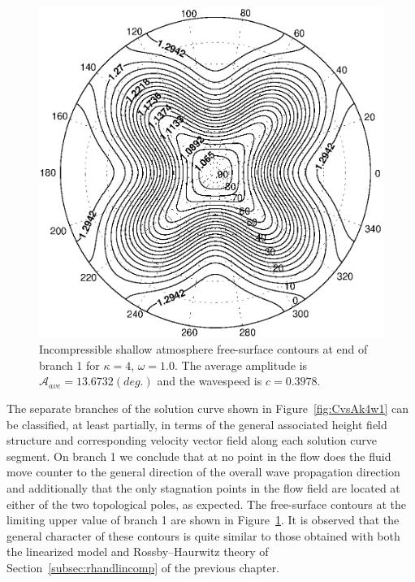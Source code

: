 \begin{figure}[htbp]
	\centering
		\includegraphics[scale=0.75]{IMAGES/k4w1fsb1end.eps}
	\caption{Incompressible shallow atmosphere free-surface contours at end of branch 1 for $\kappa=4$, $\omega=1.0$. The average amplitude is $\mathcal{A}_{ave}=13.6732 (deg.)$ and the wavespeed is $c=0.3978$.}
	\label{fig:k4w1fsb1end}
\end{figure}

The separate branches of the solution curve shown in Figure~\ref{fig:CvsAk4w1} can be classified, at least partially, in terms of the general associated height field structure and corresponding velocity vector field along each solution curve segment. On branch 1 we conclude that at no point in the flow does the fluid move counter to the general direction of the overall wave propagation direction and additionally that the only stagnation points in the flow field are located at either of the two topological poles, as expected. The free-surface contours at the limiting upper value of branch 1 are shown in Figure~\ref{fig:k4w1fsb1end}. It is observed that the general character of these contours is quite similar to those obtained with both the linearized model and Rossby--Haurwitz theory of Section~\ref{subsec:rhandlincomp} of the previous chapter.

